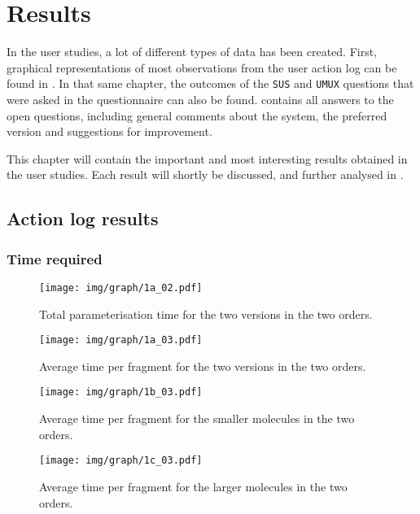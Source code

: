\chapter{Results}

In the user studies, a lot of different types of data has been created. First, graphical representations of most observations from the user action log can be found in . In that same chapter, the outcomes of the \verb|SUS| and \verb|UMUX| questions that were asked in the questionnaire can also be found.  contains all answers to the open questions, including general comments about the system, the preferred version and suggestions for improvement.

This chapter will contain the important and most interesting results obtained in the user studies. Each result will shortly be discussed, and further analysed in .


\section{Action log results}
\nlipsum

\subsection{Time required}
\nlipsum

\begin{figure}
\center
\texttt{[image: img/graph/1a\_02.pdf]}
\caption{Total parameterisation time for the two versions in the two orders.}
\end{figure}

\begin{figure}
\center
\texttt{[image: img/graph/1a\_03.pdf]}
\caption{Average time per fragment for the two versions in the two orders.}
\end{figure}

\begin{figure}
\center
\texttt{[image: img/graph/1b\_03.pdf]}
\caption{Average time per fragment for the smaller molecules in the two orders.}
\end{figure}

\begin{figure}
\center
\texttt{[image: img/graph/1c\_03.pdf]}
\caption{Average time per fragment for the larger molecules in the two orders.}
\end{figure}


